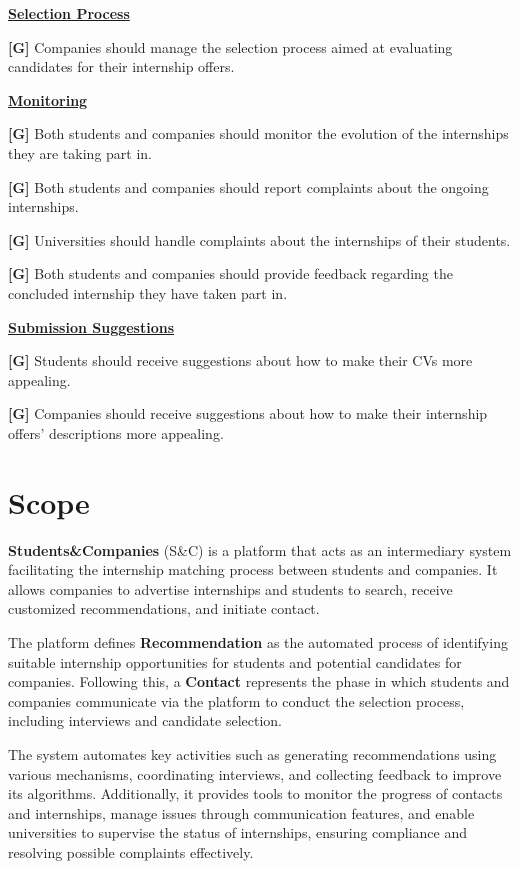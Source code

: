     \uline{\textbf{Selection Process}}

        \textbf{[G\cg]} Companies should manage the selection process aimed at evaluating candidates for their internship offers.
        
    \uline{\textbf{Monitoring}}

        \textbf{[G\cg]} Both students and companies should monitor the evolution of the internships they are taking part in. 

        \textbf{[G\cg]} Both students and companies should report complaints about the ongoing internships.

        \textbf{[G\cg]} Universities should handle complaints about the internships of their students.

        \textbf{[G\cg]} Both students and companies should provide feedback regarding the concluded internship they have taken part in.

    \uline{\textbf{Submission Suggestions}}

        \textbf{[G\cg]} Students should receive suggestions about how to make their CVs more appealing.
        
        \textbf{[G\cg]} Companies should receive suggestions about how to make their internship offers' descriptions more appealing.

\section{Scope}
\label{sec:scope}

\textbf{Students\&Companies} (S\&C) is a platform that acts as an intermediary system facilitating the internship matching process between students and companies. It allows companies to advertise internships and students to search, receive customized recommendations, and initiate contact.

The platform defines \textbf{Recommendation} as the automated process of identifying suitable internship opportunities for students and potential candidates for companies. Following this, a \textbf{Contact} represents the phase in which students and companies communicate via the platform to conduct the selection process, including interviews and candidate selection.

The system automates key activities such as generating recommendations using various mechanisms, coordinating interviews, and collecting feedback to improve its algorithms. Additionally, it provides tools to monitor the progress of contacts and internships, manage issues through communication features, and enable universities to supervise the status of internships, ensuring compliance and resolving possible complaints effectively.

